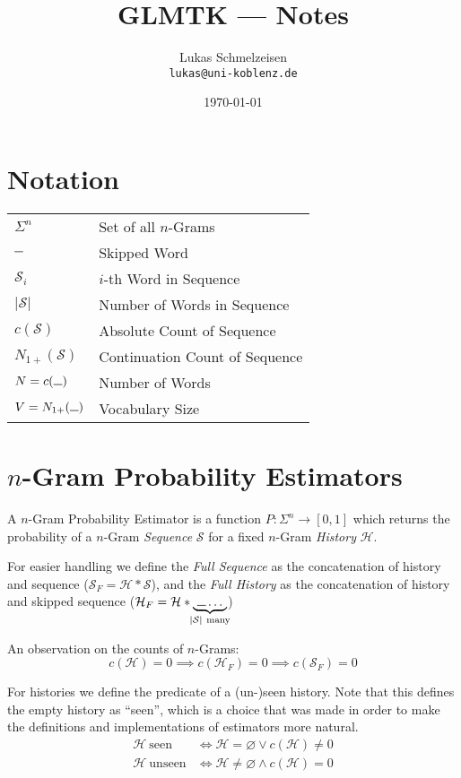 \documentclass[11pt,a4paper]{article}
\title{GLMTK --- Notes}
\author{Lukas Schmelzeisen \\ \texttt{lukas@uni-koblenz.de}}
\date{\today}
\newcommand{\Seq}{\mathcal{S}}
\newcommand{\Hist}{\mathcal{H}}
\newcommand{\SeqF}{\mathcal{S}_F}
\newcommand{\HistF}{\mathcal{H}_F}
\newcommand{\Skp}{\rule{7pt}{.5pt}}
\begin{document}
  \maketitle
  \tableofcontents
  \clearpage

  \section{Notation}

  \begin{tabular}{ l l }
    $\Sigma^n$  & Set of all $n$-Grams \\
    $\Skp$ & Skipped Word \\
    $\Seq_i$ & $i$-th Word in Sequence \\
    $|\Seq|$ & Number of Words in Sequence \\
    $c(\Seq)$ & Absolute Count of Sequence \\
    $N_{1+}(\Seq)$ & Continuation Count of Sequence \\
    $N = c(\Skp)$ & Number of Words \\
    $V = N_{1+}(\Skp)$ & Vocabulary Size \\
  \end{tabular}

  \section{$n$-Gram Probability Estimators}

  A $n$-Gram Probability Estimator is a function $P :\Sigma^n \to [0,1]$ which
  returns the probability of a $n$-Gram \emph{Sequence} $\Seq$ for a fixed
  $n$-Gram \emph{History} $\Hist$.

  For easier handling we define the \emph{Full Sequence} as the concatenation
  of history and sequence ($\SeqF = \Hist * \Seq$), and the \emph{Full History}
  as the concatenation of history and skipped sequence
  ($\HistF = \Hist * \underbrace{~ \Skp \dotso ~}_{\mathclap{|\Seq| ~ \text{many}}}$)

  An observation on the counts of $n$-Grams:
  \begin{equation}
    c(\Hist) = 0 \implies c(\HistF) = 0 \implies c(\SeqF) = 0
  \end{equation}

  For histories we define the predicate of a (un-)seen history. Note that this
  defines the empty history as ``seen'', which is a choice that was made in
  order to make the definitions and implementations of estimators more natural.
  \begin{equation}
    \begin{aligned}
      \Hist ~ \mathrm{seen} &\iff \Hist = \varnothing \lor c(\Hist) \neq 0 \\
      \Hist ~ \mathrm{unseen} &\iff \Hist \neq \varnothing \land c(\Hist) = 0
    \end{aligned}
  \end{equation}
\end{document}
